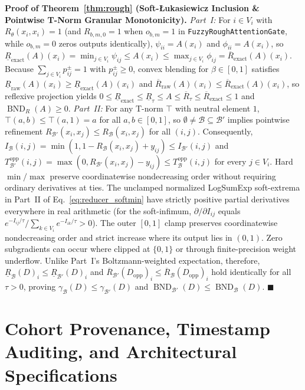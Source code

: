 \documentclass[10pt,twocolumn]{article}
\begin{document}
\noindent\textbf{Proof of Theorem~\ref{thm:rough} (Soft-\L ukasiewicz Inclusion \& Pointwise
T-Norm Granular Monotonicity).}
\textit{Part~I:} For $i \in V_i$ with $R_\theta(x_i,x_i)=1$ (and $R_{b,m,0}=1$ when $o_{b,m}=1$
in \texttt{FuzzyRoughAttentionGate}, while $o_{b,m}=0$ zeros outputs identically), $\psi_{ii} =
A(x_i)$ and $\phi_{ii} = A(x_i)$, so $\underline{R}_{\text{exact}}(A)(x_i) = \min_{j\in
V_i}\psi_{ij} \le A(x_i) \le \max_{j\in V_i}\phi_{ij} = \overline{R}_{\text{exact}}(A)(x_i)$.
Because $\sum_{j\in V_i} p_{ij}^\pm = 1$ with $p_{ij}^\pm \ge 0$, convex blending for $\beta
\in [0, 1]$ satisfies $\underline{R}_{\text{raw}}(A)(x_i) \ge
\underline{R}_{\text{exact}}(A)(x_i)$ and $\overline{R}_{\text{raw}}(A)(x_i) \le
\overline{R}_{\text{exact}}(A)(x_i)$, so reflexive projection yields $0 \le
\underline{R}_{\text{exact}} \le \underline{R}_\tau \le A \le \overline{R}_\tau \le
\overline{R}_{\text{exact}} \le 1$ and $\operatorname{BND}_R(A) \ge 0$. \textit{Part~II:} For
any T-norm $\top$ with neutral element $1$, $\top(a, b) \le \top(a, 1) = a$ for all $a,b \in
[0, 1]$, so $\emptyset \neq \mathcal{B} \subseteq \mathcal{B}'$ implies pointwise refinement
$R_{\mathcal{B}'}(x_i,x_j) \le R_{\mathcal{B}}(x_i,x_j)$ for all $(i,j)$. Consequently,
$I_{\mathcal{B}}(i,j) = \min(1, 1 - R_{\mathcal{B}}(x_i,x_j) + y_{ij}) \le
I_{\mathcal{B}'}(i,j)$ and $T_{\mathcal{B}'}^{\text{opp}}(i,j) = \max(0,
R_{\mathcal{B}'}(x_i,x_j) - y_{ij}) \le T_{\mathcal{B}}^{\text{opp}}(i,j)$ for every $j \in
V_i$. Hard $\min/\max$ preserve coordinatewise nondecreasing order without requiring
ordinary derivatives at ties. The unclamped normalized LogSumExp soft-extrema in Part~II of
Eq.~\eqref{eq:reducer_softmin} have strictly positive partial derivatives everywhere in real
arithmetic (for the soft-infimum, $\partial/\partial I_{ij}$ equals
$e^{-I_{ij}/\tau}/\sum_{k\in V_i} e^{-I_{ik}/\tau}>0$). The outer $[0,1]$ clamp preserves
coordinatewise nondecreasing order and strict increase where its output lies in $(0,1)$.
Zero subgradients can occur where clipped at $\{0,1\}$ or through finite-precision weight
underflow. Unlike Part~I's Boltzmann-weighted expectation, therefore,
$\underline{R}_{\mathcal{B}}(D)_i \le \underline{R}_{\mathcal{B}'}(D)_i$ and
$\overline{R}_{\mathcal{B}'}(D_{\text{opp}})_i \le
\overline{R}_{\mathcal{B}}(D_{\text{opp}})_i$ hold identically for all $\tau > 0$, proving
$\gamma_{\mathcal{B}}(D) \le \gamma_{\mathcal{B}'}(D)$ and
$\operatorname{BND}_{\mathcal{B}'}(D) \le \operatorname{BND}_{\mathcal{B}}(D)$. $\blacksquare$

\section{Cohort Provenance, Timestamp Auditing, and Architectural Specifications}
\label{app:provenance}
\end{document}

